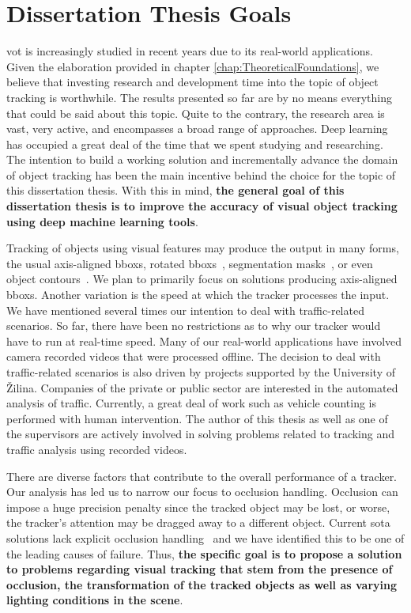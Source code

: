 \chapter{Dissertation Thesis Goals}
\label{chap:Goals}

\Gls{vot} is increasingly studied in recent years due to its real-world applications. Given the elaboration provided in chapter \ref{chap:TheoreticalFoundations}, we believe that investing research and development time into the topic of object tracking is worthwhile. The results presented so far are by no means everything that could be said about this topic. Quite to the contrary, the research area is vast, very active, and encompasses a broad range of approaches. Deep learning has occupied a great deal of the time that we spent studying and researching. The intention to build a working solution and incrementally advance the domain of object tracking has been the main incentive behind the choice for the topic of this dissertation thesis. With this in mind, \textbf{the general goal of this dissertation thesis is to improve the accuracy of visual object tracking using deep machine learning tools}.

Tracking of objects using visual features may produce the output in many forms, the usual axis-aligned \glspl{bbox}, rotated \glspl{bbox}~\cite{chen2019rotbboxes}, segmentation masks~\cite{wang2019siammask}, or even object contours~\cite{yang2016encoderdecoder}. We plan to primarily focus on solutions producing axis-aligned \glspl{bbox}. Another variation is the speed at which the tracker processes the input. We have mentioned several times our intention to deal with traffic-related scenarios. So far, there have been no restrictions as to why our tracker would have to run at real-time speed. Many of our real-world applications have involved camera recorded videos that were processed offline. The decision to deal with traffic-related scenarios is also driven by projects supported by the University of Žilina. Companies of the private or public sector are interested in the automated analysis of traffic. Currently, a great deal of work such as vehicle counting is performed with human intervention. The author of this thesis as well as one of the supervisors are actively involved in solving problems related to tracking and traffic analysis using recorded videos.

There are diverse factors that contribute to the overall performance of a tracker. Our analysis has led us to narrow our focus to occlusion handling. Occlusion can impose a huge precision penalty since the tracked object may be lost, or worse, the tracker's attention may be dragged away to a different object. Current \gls{sota} solutions lack explicit occlusion handling~\cite{guo2019siamcar, li2018siamrpn, wang2019siammask} and we have identified this to be one of the leading causes of failure. Thus, \textbf{the specific goal is to propose a solution to problems regarding visual tracking that stem from the presence of occlusion, the transformation of the tracked objects as well as varying lighting conditions in the scene}.

